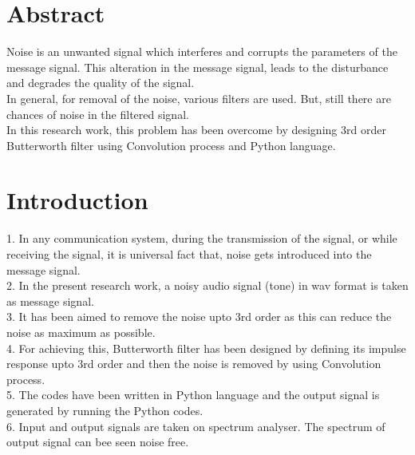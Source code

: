 \documentclass[journal,10pt,twocolumn]{article}
\begin{document}
\author{\textit{Meer Tabres Ali $^{\small Author1}$ and G V V Sharma $^{\small Author2}$}} 
\date{\textit{March 5, 2023}}

\maketitle
\tableofcontents

\vspace{5cm}

\section{Abstract}
\begin{flushleft}
Noise is an unwanted signal which interferes and corrupts the parameters of the message signal. This alteration in the message signal, leads to the disturbance and degrades the quality of the signal. \\
\vspace{0.2cm}
In general, for removal of the noise, various filters are used. But, still there are chances of noise in the filtered signal.\\
\vspace{0.2cm}
In this research work, this problem has been overcome by designing 3rd order Butterworth filter using Convolution process and Python language.\\
\end{flushleft}
\section{Introduction}

\begin{flushleft}
1. In any communication system, during the transmission of the signal, or while receiving the signal, it is universal fact that, noise gets introduced into the message signal.\\

2. In the present research work, a noisy audio signal (tone) in wav format is taken as message signal.\\
\vspace{0.2cm}
3. It has been aimed to remove the noise upto 3rd order as this can reduce the noise as maximum as possible. \\
\vspace{0.2cm}
4. For achieving this, Butterworth filter has been designed by defining its impulse response upto 3rd order and then the noise is removed by using Convolution process. \\
\vspace{0.2cm}
5. The codes have been written in Python language and the output signal is generated by running the Python codes. \\
\vspace{0.2cm}
6. Input and output signals are taken on spectrum analyser. The spectrum of output signal can bee seen noise free. 
\end{flushleft}
\end{document}
